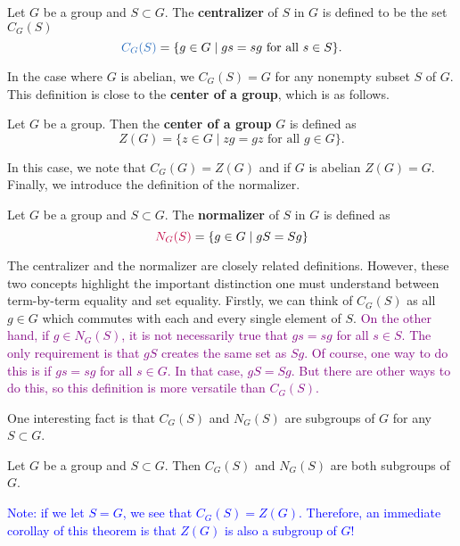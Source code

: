     \begin{definition}
        Let $G$ be a group and $S \subset G$. The \textbf{centralizer}
        of $S$ in $G$ is defined to be the set $C_G(S)$
        \[
            \textcolor{NavyBlue}{C_G(S)} = \{g \in G \mid gs = sg \text{ for all } s \in S\}.
        \]
    \end{definition}
    In the case where $G$ is abelian, we $C_G(S) = G$ for any nonempty
    subset $S$ of $G$. This definition is close to the \textbf{center
    of a group}, which is as follows.

    \begin{definition}
        Let $G$ be a group. Then the \textbf{center of a group} $G$ is
        defined as 
        \[
            Z(G) = \{z \in G \mid zg = gz \text{ for all } g \in G\}.
        \]
    \end{definition}

    In this case, we note that $C_G(G) = Z(G)$ and if $G$ is abelian
    $Z(G) = G$. Finally, we introduce the definition of the
    normalizer.
    
    \begin{definition}
        Let $G$ be a group and $S \subset G$. The \textbf{normalizer}
        of $S$ in $G$ is defined as 
        \[
            \textcolor{purple}{N_G(S)} = \{g \in G \mid gS = Sg\}
        \]
    \end{definition}
    
    The centralizer and the normalizer are closely related
    definitions. However, these two concepts highlight the important
    distinction one must understand between term-by-term equality and
    set equality. \textcolor{NavyBlue}{Firstly, we can think of $C_G(S)$ as all $g \in G$
    which commutes with each and every single element of $S$.} 
    \textcolor{purple}{On the
    other hand, if $g \in N_G(S)$, it is not necessarily true that $gs
    = sg$ for all $s \in S$. The only requirement is that $gS$
    creates the same set as $Sg$. Of course, one way to do this is
    if $gs = sg$ for all $s \in G$. In that case, $gS = Sg$. But there
    are other ways to do this, so this definition is more versatile
    than $C_G(S)$.}

    One interesting fact is that $C_G(S)$ and $N_G(S)$ are subgroups
    of $G$ for any $S \subset G$. 

    \begin{thm}
        Let $G$ be a group and $S \subset G$. Then $C_G(S)$ and
        $N_G(S)$ are both subgroups of $G$.
    \end{thm}
    \textcolor{blue}{Note: if we let $S = G$, we see that $C_G(S) =
    Z(G)$. 
    Therefore, an immediate corollay of this theorem is that $Z(G)$ is
    also a subgroup of $G$!}

